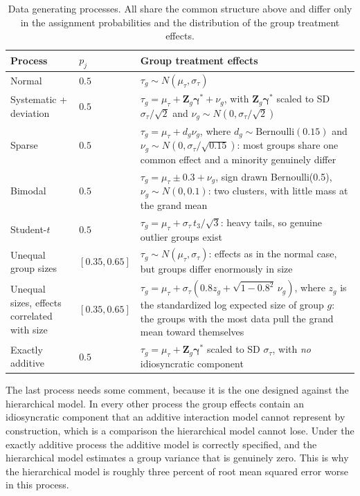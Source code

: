 \documentclass[12pt]{article}
\begin{document}
\begin{table}[htbp]
\centering
\small
\begin{tabular}{>{\raggedright\arraybackslash}p{2.4cm}>{\centering\arraybackslash}p{1.9cm}>{\raggedright\arraybackslash}p{8.0cm}}
\hline
Process & $p_j$ & Group treatment effects \\
\hline
Normal & $0.5$ & $\tau_g \sim N(\mu_\tau, \sigma_\tau)$ \\
Systematic + deviation & $0.5$ & $\tau_g = \mu_\tau + \mathbf{Z}_g\boldsymbol{\gamma}^* + \nu_g$, with $\mathbf{Z}_g\boldsymbol{\gamma}^*$ scaled to SD $\sigma_\tau/\sqrt{2}$ and $\nu_g \sim N(0, \sigma_\tau/\sqrt{2})$ \\
Sparse & $0.5$ & $\tau_g = \mu_\tau + d_g \nu_g$, where $d_g \sim \text{Bernoulli}(0.15)$ and $\nu_g \sim N(0, \sigma_\tau/\sqrt{0.15})$: most groups share one common effect and a minority genuinely differ \\
Bimodal & $0.5$ & $\tau_g = \mu_\tau \pm 0.3 + \nu_g$, sign drawn Bernoulli(0.5), $\nu_g \sim N(0, 0.1)$: two clusters, with little mass at the grand mean \\
Student-$t$ & $0.5$ & $\tau_g = \mu_\tau + \sigma_\tau \, t_3 / \sqrt{3}$: heavy tails, so genuine outlier groups exist \\
Unequal group sizes & $[0.35, 0.65]$ & $\tau_g \sim N(\mu_\tau, \sigma_\tau)$: effects as in the normal case, but groups differ enormously in size \\
Unequal sizes, effects correlated with size & $[0.35, 0.65]$ & $\tau_g = \mu_\tau + \sigma_\tau(0.8 z_g + \sqrt{1 - 0.8^2}\,\nu_g)$, where $z_g$ is the standardized log expected size of group $g$: the groups with the most data pull the grand mean toward themselves \\
Exactly additive & $0.5$ & $\tau_g = \mu_\tau + \mathbf{Z}_g\boldsymbol{\gamma}^*$ scaled to SD $\sigma_\tau$, with \emph{no} idiosyncratic component \\
\hline
\end{tabular}
\caption{Data generating processes. All share the common structure above and differ only in the assignment probabilities and the distribution of the group treatment effects.}
\label{tab:dgps}
\end{table}

The last process needs some comment, because it is the one designed against the hierarchical model.
In every other process the group effects contain an idiosyncratic component that an additive interaction model cannot represent by construction, which is a comparison the hierarchical model cannot lose.
Under the exactly additive process the additive model is correctly specified, and the hierarchical model estimates a group variance that is genuinely zero.
This is why the hierarchical model is roughly three percent of root mean squared error worse in this process.
\end{document}
